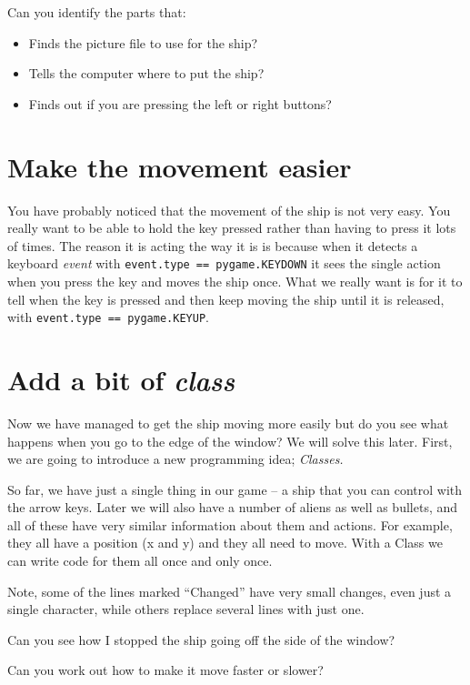 \documentclass{article}
\newcommand{\pythonscript}[2]{
\begin{itemize}
\item[]
\end{itemize}
}
\newenvironment{hint}{
  \begin{tcolorbox}[colback=green!5,colframe=green!40!black,title=Note]}
{\end{tcolorbox}}
\begin{document}
Can you identify the parts that:

\begin{itemize}
  \item Finds the picture file to use for the ship?
  \item Tells the computer where to put the ship?
  \item Finds out if you are pressing the left or right buttons?
\end{itemize}


\section{Make the movement easier}

You have probably noticed that the movement of the ship is not very easy. You
really want to be able to hold the key pressed rather than having to press it
lots of times. The reason it is acting the way it is is because when it
detects a keyboard \emph{event} with \texttt{event.type == pygame.KEYDOWN} it sees
the single action when you press the key and moves the ship once. What we
really want is for it to tell when the key is pressed and then keep moving
the ship until it is released, with \texttt{event.type == pygame.KEYUP}.


\section{Add a bit of \emph{class}}

Now we have managed to get the ship moving more easily but do you see what
happens when you go to the edge of the window? We will solve this later.
First, we are going to introduce a new
programming idea; \emph{Classes.}

So far, we have just a single thing in our game -- a ship that you can control
with the arrow keys. Later we will also have a number of aliens as well as
bullets, and all of these have very similar information about them and actions.
For example, they all have a position (x and y) and they all need to move.
With a Class we can write code for them all once and only once.

\begin{hint}
Note, some of the lines marked ``Changed'' have very small changes, even just a
single character, while others replace several lines with just one.

Can you see how I stopped the ship going off the side of the window?

Can you work out how to make it move faster or slower?
\end{hint}
\end{document}

